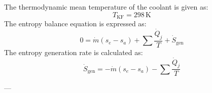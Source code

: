 The thermodynamic mean temperature of the coolant is given as:  
\[
T_{\text{KF}} = 298 \, \text{K}
\]  
The entropy balance equation is expressed as:  
\[
0 = \dot{m} \left( s_e - s_a \right) + \sum \frac{\dot{Q}_j}{T} + \dot{S}_{\text{gen}}
\]  
The entropy generation rate is calculated as:  
\[
\dot{S}_{\text{gen}} = -\dot{m} \left( s_e - s_a \right) - \sum \frac{\dot{Q}_j}{T}
\]  

---